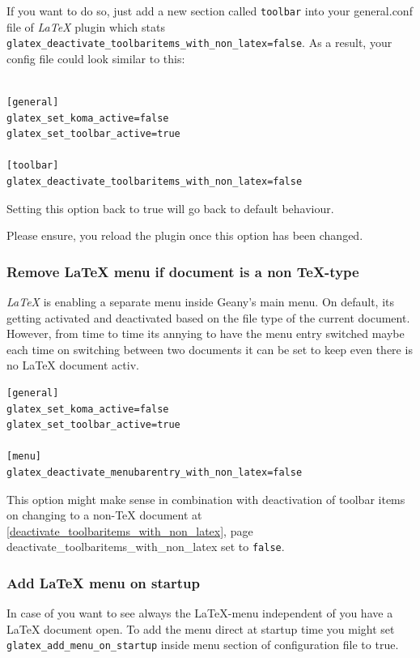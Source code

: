 \documentclass[%
paper=a4,%
fontsize=11pt,%
twoside=false,%
DIV18,%
headsepline,%
plainheadsepline,%
footsepline,%
plainfootsepline,%
bibliography=totoc,%
listof=totoc,%
BCOR10mm,%
parskip=half,%
openany,%
]{scrartcl}
\begin{document}
If you want to do so, just add a new section called \texttt{toolbar}
into your general.conf file of \textit{LaTeX} plugin which stats
\texttt{glatex\_deactivate\_toolbaritems\_with\_non\_latex=false}.
As a result, your config file could look similar to this:

\begin{lstlisting}[caption={Configuration to enable toolbar buttons if %
						    no \LaTeX{} is active}]

[general]
glatex_set_koma_active=false
glatex_set_toolbar_active=true

[toolbar]
glatex_deactivate_toolbaritems_with_non_latex=false
\end{lstlisting}

Setting this option back to true will go back to default behaviour.

Please ensure, you reload the plugin once this option has been changed.

\subsubsection{Remove \LaTeX{} menu if document is a non \TeX-type}
\label{deactivate_menubarentry_with_non_latex}
\textit{LaTeX} is enabling a separate menu inside Geany's main menu.
On default, its getting activated and deactivated based on the file
type of the current document. However, from time to time its annying
to have the menu entry switched maybe each time on switching between
two documents it can be set to keep even there is no LaTeX document
activ.

\begin{lstlisting}[caption={Configuration to keep \LaTeX{} menu inside menubar}]
[general]
glatex_set_koma_active=false
glatex_set_toolbar_active=true

[menu]
glatex_deactivate_menubarentry_with_non_latex=false
\end{lstlisting}

This option might make sense in combination with deactivation of
toolbar items on changing to a non-\TeX{} document at
\ref{deactivate_toolbaritems_with_non_latex}, page \pageref
{deactivate_toolbaritems_with_non_latex} set to \texttt{false}.

\subsubsection{Add \LaTeX{} menu on startup}

In case of you want to see always the \LaTeX{}-menu independent of
you have a \LaTeX{} document open. To add the menu direct at startup
time you might set \texttt{glatex\_add\_menu\_on\_startup} inside
menu section of configuration file to true.
\end{document}
